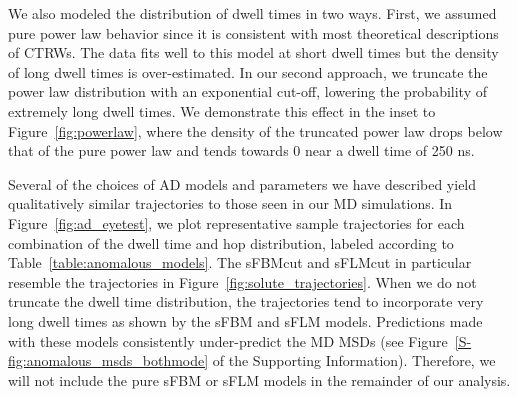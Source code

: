 \documentclass[journal=jctcce,manuscript=article]{achemso}
\begin{document}
  We also modeled the distribution of dwell times in two ways. First, we
  assumed pure power law behavior since it is consistent with most theoretical
  descriptions of CTRWs. The data fits well to this model at short dwell times
  but the density of long dwell times is over-estimated. In our second
  approach, we truncate the power law distribution with an exponential cut-off,
  lowering the probability of extremely long dwell times. We demonstrate this
  effect in the inset to Figure~\ref{fig:powerlaw}, where the density of the
  truncated power law drops below that of the pure power law and tends towards
  0 near a dwell time of 250 ns.
  
  Several of the choices of AD models and parameters we have described yield
  qualitatively similar trajectories to those seen in our MD simulations.  In
  Figure~\ref{fig:ad_eyetest}, we plot representative sample trajectories for
  each combination of the dwell time and hop distribution, labeled according to
  Table~\ref{table:anomalous_models}. The sFBMcut and sFLMcut in particular
  resemble the trajectories in Figure~\ref{fig:solute_trajectories}.  When we
  do not truncate the dwell time distribution, the trajectories tend to
  incorporate very long dwell times as shown by the sFBM and sFLM models.
  Predictions made with these models consistently under-predict the MD MSDs
  (see Figure~\ref{S-fig:anomalous_msds_bothmode} of the Supporting Information).
  Therefore, we will not include the pure sFBM or sFLM models in the
  remainder of our analysis.   
  
\end{document}
